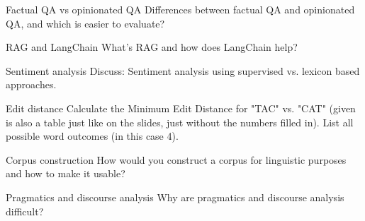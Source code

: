 \documentclass{article}
\begin{document}
\begin{exercise}{Factual QA vs opinionated QA}
  Differences between factual QA and opinionated QA, and which is easier to evaluate?

  \begin{solution}
  \end{solution}
\end{exercise}

\begin{exercise}{RAG and LangChain}
  What's RAG and how does LangChain help?

  \begin{solution}
  \end{solution}
\end{exercise}

\begin{exercise}{Sentiment analysis}
  Discuss: Sentiment analysis using supervised vs. lexicon based approaches.

  \begin{solution}
  \end{solution}
\end{exercise}

\begin{exercise}{Edit distance}
  Calculate the Minimum Edit Distance for "TAC" vs. "CAT" (given is also a table just like on the slides, just without the numbers filled in). List all possible word outcomes (in this case 4).

  \begin{solution}
  \end{solution}
\end{exercise}




\begin{exercise}{Corpus construction}
  How would you construct a corpus for linguistic purposes and how to make it usable?

  \begin{solution}
  \end{solution}
\end{exercise}

\begin{exercise}{Pragmatics and discourse analysis}
  Why are pragmatics and discourse analysis difficult?

  \begin{solution}
  \end{solution}
\end{exercise}
\end{document}
